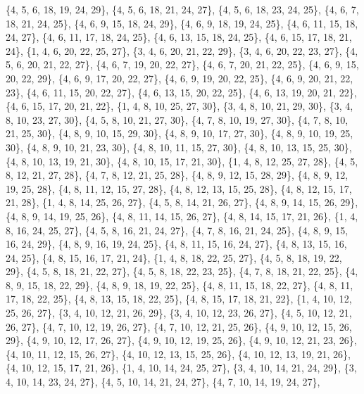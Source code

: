 \documentclass[11pt,a4paper]{article}
\begin{document}
{\{4, 5, 6, 18, 19, 24, 29\}, \{4, 5, 6, 18, 21, 24, 27\}, \{4, 5, 6, 18, 23, 24, 25\}, \{4, 6, 7, 18, 21, 24, 25\}, \{4, 6, 9, 15, 18, 24, 29\},
\{4, 6, 9, 18, 19, 24, 25\}, \{4, 6, 11, 15, 18, 24, 27\}, \{4, 6, 11, 17, 18, 24, 25\}, \{4, 6, 13, 15, 18, 24, 25\}, \{4, 6, 15, 17, 18, 21, 24\},
\{1, 4, 6, 20, 22, 25, 27\}, \{3, 4, 6, 20, 21, 22, 29\}, \{3, 4, 6, 20, 22, 23, 27\}, \{4, 5, 6, 20, 21, 22, 27\}, \{4, 6, 7, 19, 20, 22, 27\},
\{4, 6, 7, 20, 21, 22, 25\}, \{4, 6, 9, 15, 20, 22, 29\}, \{4, 6, 9, 17, 20, 22, 27\}, \{4, 6, 9, 19, 20, 22, 25\}, \{4, 6, 9, 20, 21, 22, 23\},
\{4, 6, 11, 15, 20, 22, 27\}, \{4, 6, 13, 15, 20, 22, 25\}, \{4, 6, 13, 19, 20, 21, 22\}, \{4, 6, 15, 17, 20, 21, 22\}, \{1, 4, 8, 10, 25, 27, 30\},
\{3, 4, 8, 10, 21, 29, 30\}, \{3, 4, 8, 10, 23, 27, 30\}, \{4, 5, 8, 10, 21, 27, 30\}, \{4, 7, 8, 10, 19, 27, 30\}, \{4, 7, 8, 10, 21, 25, 30\},
\{4, 8, 9, 10, 15, 29, 30\}, \{4, 8, 9, 10, 17, 27, 30\}, \{4, 8, 9, 10, 19, 25, 30\}, \{4, 8, 9, 10, 21, 23, 30\}, \{4, 8, 10, 11, 15, 27, 30\},
\{4, 8, 10, 13, 15, 25, 30\}, \{4, 8, 10, 13, 19, 21, 30\}, \{4, 8, 10, 15, 17, 21, 30\}, \{1, 4, 8, 12, 25, 27, 28\}, \{4, 5, 8, 12, 21, 27, 28\},
\{4, 7, 8, 12, 21, 25, 28\}, \{4, 8, 9, 12, 15, 28, 29\}, \{4, 8, 9, 12, 19, 25, 28\}, \{4, 8, 11, 12, 15, 27, 28\}, \{4, 8, 12, 13, 15, 25, 28\},
\{4, 8, 12, 15, 17, 21, 28\}, \{1, 4, 8, 14, 25, 26, 27\}, \{4, 5, 8, 14, 21, 26, 27\}, \{4, 8, 9, 14, 15, 26, 29\}, \{4, 8, 9, 14, 19, 25, 26\},
\{4, 8, 11, 14, 15, 26, 27\}, \{4, 8, 14, 15, 17, 21, 26\}, \{1, 4, 8, 16, 24, 25, 27\}, \{4, 5, 8, 16, 21, 24, 27\}, \{4, 7, 8, 16, 21, 24, 25\},
\{4, 8, 9, 15, 16, 24, 29\}, \{4, 8, 9, 16, 19, 24, 25\}, \{4, 8, 11, 15, 16, 24, 27\}, \{4, 8, 13, 15, 16, 24, 25\}, \{4, 8, 15, 16, 17, 21, 24\},
\{1, 4, 8, 18, 22, 25, 27\}, \{4, 5, 8, 18, 19, 22, 29\}, \{4, 5, 8, 18, 21, 22, 27\}, \{4, 5, 8, 18, 22, 23, 25\}, \{4, 7, 8, 18, 21, 22, 25\},
\{4, 8, 9, 15, 18, 22, 29\}, \{4, 8, 9, 18, 19, 22, 25\}, \{4, 8, 11, 15, 18, 22, 27\}, \{4, 8, 11, 17, 18, 22, 25\}, \{4, 8, 13, 15, 18, 22, 25\},
\{4, 8, 15, 17, 18, 21, 22\}, \{1, 4, 10, 12, 25, 26, 27\}, \{3, 4, 10, 12, 21, 26, 29\}, \{3, 4, 10, 12, 23, 26, 27\}, \{4, 5, 10, 12, 21, 26, 27\},
\{4, 7, 10, 12, 19, 26, 27\}, \{4, 7, 10, 12, 21, 25, 26\}, \{4, 9, 10, 12, 15, 26, 29\}, \{4, 9, 10, 12, 17, 26, 27\}, \{4, 9, 10, 12, 19, 25, 26\},
\{4, 9, 10, 12, 21, 23, 26\}, \{4, 10, 11, 12, 15, 26, 27\}, \{4, 10, 12, 13, 15, 25, 26\}, \{4, 10, 12, 13, 19, 21, 26\}, \{4, 10, 12, 15, 17, 21, 26\},
\{1, 4, 10, 14, 24, 25, 27\}, \{3, 4, 10, 14, 21, 24, 29\}, \{3, 4, 10, 14, 23, 24, 27\}, \{4, 5, 10, 14, 21, 24, 27\}, \{4, 7, 10, 14, 19, 24, 27\},
}
\end{document}
